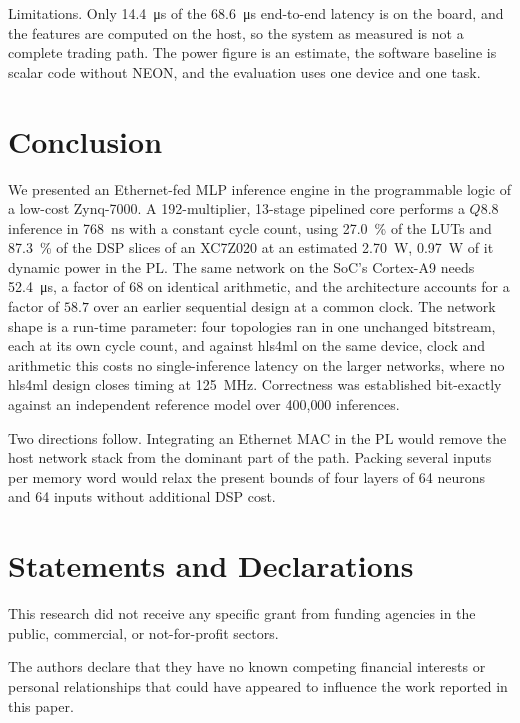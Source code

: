 \documentclass[pdflatex,sn-mathphys-num,iicol]{sn-jnl}
\begin{document}
Limitations. Only \SI{14.4}{\micro\second} of the \SI{68.6}{\micro\second}
end-to-end latency is on the board, and the features are computed on the host,
so the system as measured is not a complete trading path. The power figure is an
estimate, the software baseline is scalar code without NEON, and the evaluation
uses one device and one task.

\section{Conclusion}
We presented an Ethernet-fed MLP inference engine in the programmable logic of a
low-cost Zynq-7000. A 192-multiplier, 13-stage pipelined core performs a $Q8.8$
inference in \SI{768}{\nano\second} with a constant cycle count, using
\SI{27.0}{\percent} of the LUTs and \SI{87.3}{\percent} of the DSP slices of an
XC7Z020 at an estimated \SI{2.70}{\watt}, \SI{0.97}{\watt} of it dynamic power in the PL. The
same network on the SoC's Cortex-A9 needs \SI{52.4}{\micro\second}, a factor of
68 on identical arithmetic, and the architecture accounts for a factor of
$58.7$ over an earlier sequential design at a common clock. The network shape is
a run-time parameter: four topologies ran in one unchanged bitstream, each at
its own cycle count, and against hls4ml on the same device, clock and arithmetic
this costs no single-inference latency on the larger networks, where no hls4ml
design closes timing at \SI{125}{\mega\hertz}. Correctness was established
bit-exactly against an independent reference model over 400{,}000 inferences.

Two directions follow. Integrating an Ethernet MAC in the PL would remove the
host network stack from the dominant part of the path. Packing several inputs per
memory word would relax the present bounds of four layers of 64 neurons and 64
inputs without additional DSP cost.

\backmatter

\section*{Statements and Declarations}

This research did not receive any specific grant from funding agencies in the
public, commercial, or not-for-profit sectors.

The authors declare that they have no known competing financial interests or
personal relationships that could have appeared to influence the work reported
in this paper.
\end{document}
